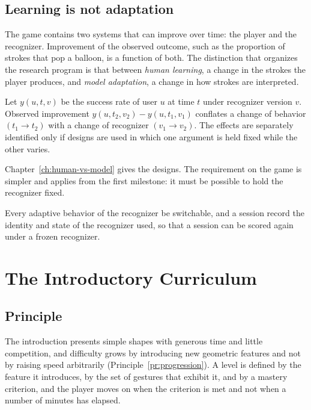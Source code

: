 \section{Learning is not adaptation}

The game contains two systems that can improve over time: the player and the recognizer. Improvement of the observed outcome, such as the proportion of strokes that pop a balloon, is a function of both. The distinction that organizes the research program is that between \emph{human learning}, a change in the strokes the player produces, and \emph{model adaptation}, a change in how strokes are interpreted.

\begin{definition}\label{def:identification}
Let $y(u,t,v)$ be the success rate of user $u$ at time $t$ under recognizer version $v$. Observed improvement $y(u,t_2,v_2)-y(u,t_1,v_1)$ conflates a change of behavior $(t_1\to t_2)$ with a change of recognizer $(v_1\to v_2)$. The effects are separately identified only if designs are used in which one argument is held fixed while the other varies.
\end{definition}

Chapter~\ref{ch:human-vs-model} gives the designs. The requirement on the game is simpler and applies from the first milestone: it must be possible to hold the recognizer fixed.

\begin{requirement}\label{req:frozen}
Every adaptive behavior of the recognizer \must{} be switchable, and a session \must{} record the identity and state of the recognizer used, so that a session can be scored again under a frozen recognizer.\evS
\end{requirement}

\chapter{The Introductory Curriculum}\label{ch:intro-curriculum}

\section{Principle}

The introduction presents simple shapes with generous time and little competition, and difficulty grows by introducing new geometric features and not by raising speed arbitrarily (Principle~\ref{pr:progression}). A level is defined by the feature it introduces, by the set of gestures that exhibit it, and by a mastery criterion, and the player moves on when the criterion is met and not when a number of minutes has elapsed.

